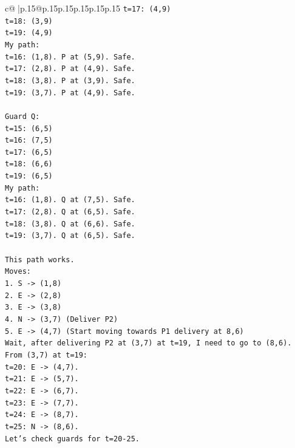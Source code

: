 \documentclass{article}
\begin{document}
{\begin{supertabular}{c@{$\;$}|p{.15\linewidth}@{}p{.15\linewidth}p{.15\linewidth}p{.15\linewidth}p{.15\linewidth}p{.15\linewidth}}
{{{\texttt{t=17: (4,9)} \\
\texttt{t=18: (3,9)} \\
\texttt{t=19: (4,9)} \\
\texttt{My path:} \\
\texttt{t=16: (1,8). P at (5,9). Safe.} \\
\texttt{t=17: (2,8). P at (4,9). Safe.} \\
\texttt{t=18: (3,8). P at (3,9). Safe.} \\
\texttt{t=19: (3,7). P at (4,9). Safe.} \\
\\ 
\texttt{Guard Q:} \\
\texttt{t=15: (6,5)} \\
\texttt{t=16: (7,5)} \\
\texttt{t=17: (6,5)} \\
\texttt{t=18: (6,6)} \\
\texttt{t=19: (6,5)} \\
\texttt{My path:} \\
\texttt{t=16: (1,8). Q at (7,5). Safe.} \\
\texttt{t=17: (2,8). Q at (6,5). Safe.} \\
\texttt{t=18: (3,8). Q at (6,6). Safe.} \\
\texttt{t=19: (3,7). Q at (6,5). Safe.} \\
\\ 
\texttt{This path works.} \\
\texttt{Moves:} \\
\texttt{1. S {-}> (1,8)} \\
\texttt{2. E {-}> (2,8)} \\
\texttt{3. E {-}> (3,8)} \\
\texttt{4. N {-}> (3,7) (Deliver P2)} \\
\texttt{5. E {-}> (4,7) (Start moving towards P1 delivery at 8,6)} \\
\texttt{Wait, after delivering P2 at (3,7) at t=19, I need to go to (8,6).} \\
\texttt{From (3,7) at t=19:} \\
\texttt{t=20: E {-}> (4,7).} \\
\texttt{t=21: E {-}> (5,7).} \\
\texttt{t=22: E {-}> (6,7).} \\
\texttt{t=23: E {-}> (7,7).} \\
\texttt{t=24: E {-}> (8,7).} \\
\texttt{t=25: N {-}> (8,6).} \\
\texttt{Let's check guards for t=20{-}25.} \\
}}}
\end{supertabular}}
\end{document}
